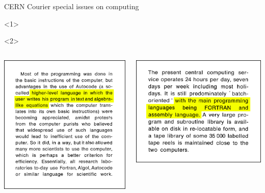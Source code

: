 \documentclass[aspectratio=169]{beamer}
\begin{document}
\begin{frame}{CERN Courier special issues on computing}
\begin{onlyenv}<1>
\vspace{3 cm}
\end{onlyenv}\begin{onlyenv}<2>
\vspace{-5.8 cm}
\begin{columns}
\includegraphics[width=\linewidth]{PLOTS/cern-courier-fortran-1.png}

\includegraphics[width=\linewidth]{PLOTS/cern-courier-fortran-2.png}

\end{columns}
\end{onlyenv}
\end{frame}
\end{document}
